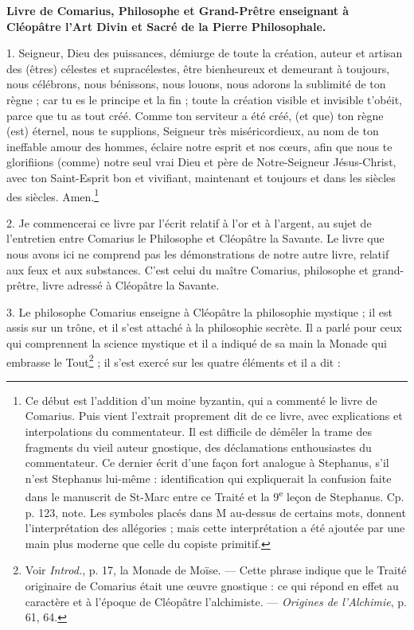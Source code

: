 \documentclass[a4paper, 11pt, oneside, polutonikogreek, french]{article}
\begin{document}
\textbf{Livre de Comarius, Philosophe et Grand-Prêtre enseignant à Cléopâtre l'Art Divin et Sacré de la Pierre Philosophale.}

1. Seigneur, Dieu des puissances, démiurge de toute la création, auteur et artisan des (êtres) célestes et supracélestes, être bienheureux et demeurant à toujours, nous célébrons, nous bénissons, nous louons, nous adorons la sublimité de ton règne ; car tu es le principe et la fin ; toute la création visible et invisible t'obéit, parce que tu as tout créé. Comme ton serviteur a été créé, (et que) ton règne (est) éternel, nous te supplions, Seigneur très miséricordieux, au nom de ton ineffable amour des hommes, éclaire notre esprit et nos cœurs, afin que nous te glorifiions (comme) notre seul vrai Dieu et père de Notre-Seigneur Jésus-Christ, avec ton Saint-Esprit bon et vivifiant, maintenant et toujours et dans les siècles des siècles. Amen.\footnote{Ce début est l'addition d'un moine byzantin, qui a commenté le livre de Comarius. Puis vient l'extrait proprement dit de ce livre, avec explications et interpolations du commentateur. Il est difficile de démêler la trame des fragments du vieil auteur gnostique, des déclamations enthousiastes du commentateur. Ce dernier écrit d'une façon fort analogue à Stephanus, s'il n'est Stephanus lui-même : identification qui expliquerait la confusion faite dans le manuscrit de St-Marc entre ce Traité et la 9\textsuperscript{e} leçon de Stephanus. Cp. p. 123, note. Les symboles placés dans M au-dessus de certains mots, donnent l'interprétation des allégories ; mais cette interprétation a été ajoutée par une main plus moderne que celle du copiste primitif.}

2. Je commencerai ce livre par l'écrit relatif à l'or et à l'argent, au sujet de l'entretien entre Comarius le Philosophe et Cléopâtre la Savante. Le livre que nous avons ici ne comprend pas les démonstrations de notre autre livre, relatif aux feux et aux substances. C'est celui du maître Comarius, philosophe et grand-prêtre, livre adressé à Cléopâtre la Savante.

3. Le philosophe Comarius enseigne à Cléopâtre la philosophie mystique ; il est assis sur un trône, et il s'est attaché à la philosophie secrète. Il a parlé pour ceux qui comprennent la science mystique et il a indiqué de sa main la Monade qui embrasse le Tout\footnote{Voir \emph{Introd.}, p. 17, la Monade de Moïse. --- Cette phrase indique que le Traité originaire de Comarius était une œuvre gnostique : ce qui répond en effet au caractère et à l'époque de Cléopâtre l'alchimiste. --- \emph{Origines de l'Alchimie}, p. 61, 64.} ; il s'est exercé sur les quatre éléments et il a dit :
\end{document}

